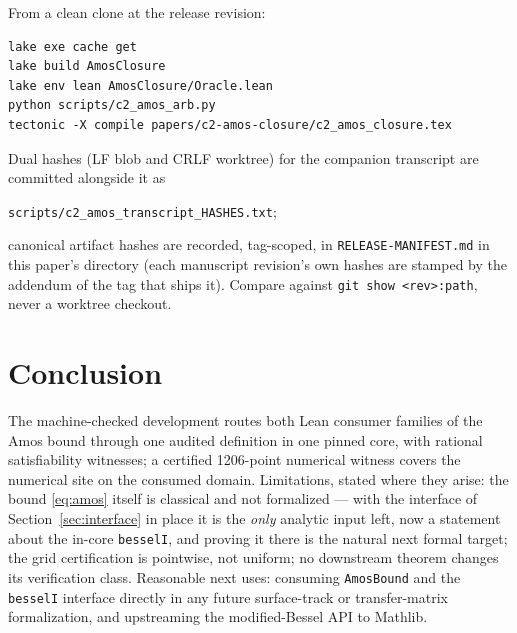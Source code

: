 \documentclass[11pt]{article}
\newcommand{\lean}[1]{\texttt{#1}}
\begin{document}
\medskip
\noindent From a clean clone at the release revision:
\begin{verbatim}
lake exe cache get
lake build AmosClosure
lake env lean AmosClosure/Oracle.lean
python scripts/c2_amos_arb.py
tectonic -X compile papers/c2-amos-closure/c2_amos_closure.tex
\end{verbatim}
Dual hashes (LF blob and CRLF worktree) for the companion transcript
are committed alongside it as
\begin{center}\small
\lean{scripts/c2\_amos\_transcript\_HASHES.txt};
\end{center}
\noindent canonical artifact hashes are recorded, tag-scoped, in
\lean{RELEASE-MANIFEST.md} in this paper's directory (each
manuscript revision's own hashes are stamped by the addendum of the
tag that ships it).  Compare against \lean{git show <rev>:path},
never a worktree checkout.

\section{Conclusion}

The machine-checked development routes both Lean consumer families of
the Amos bound through one audited definition in one pinned core,
with rational satisfiability witnesses; a certified 1206-point
numerical witness covers the numerical site on the consumed domain.  Limitations, stated where
they arise: the bound \eqref{eq:amos} itself is classical and not
formalized --- with the interface of Section~\ref{sec:interface} in
place it is the \emph{only} analytic input left, now a statement
about the in-core \lean{besselI}, and proving it there is the
natural next formal target; the grid certification is pointwise, not
uniform; no downstream theorem changes its verification class.
Reasonable next uses: consuming \lean{AmosBound} and the
\lean{besselI} interface directly in any future surface-track or
transfer-matrix formalization, and upstreaming the modified-Bessel
API to Mathlib.
\end{document}
